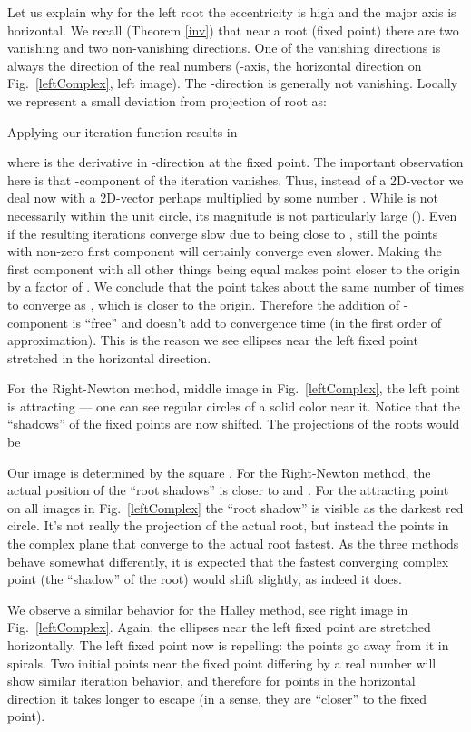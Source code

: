 \documentclass{article}
\theoremstyle{definition}
\begin{document}
Let us explain why for the left root the eccentricity is high and the major axis is horizontal. We recall (Theorem \ref{inv}) that near a root (fixed point) there are two vanishing and two non-vanishing directions. One of the vanishing directions is always the direction of the real numbers (-axis, the horizontal direction on  Fig.~\ref{leftComplex}, left image). The -direction is generally not vanishing. Locally we represent a small deviation from projection  of root  as:

Applying our iteration function results in

where  is the derivative in -direction at the fixed point. The important observation here is that -component of the iteration vanishes. Thus, instead of  a 2D-vector  we deal now with a 2D-vector  perhaps multiplied by some number . While  is not necessarily within the unit circle, its magnitude is not particularly large (). Even if the resulting iterations converge slow due to  being close to , still the points with non-zero first component will certainly converge even slower. Making the first component  with all other things being equal makes point closer to the origin by a factor of . We conclude that the point  takes about the same number of times to converge as , which is closer to the origin. Therefore the addition of -component is ``free'' and doesn't add to convergence time (in the first order of approximation). This is the reason we see ellipses near the left fixed point stretched in the horizontal direction.

For the Right-Newton method, middle image in Fig.~\ref{leftComplex}, the left point is attracting --- one can see regular circles of a solid color near it. Notice that the ``shadows'' of the fixed points are now shifted. The projections of the roots would be

Our image is determined by the square . For the Right-Newton method, the actual position of the ``root shadows'' is closer to  and . For the attracting point on all images in Fig.~\ref{leftComplex} the ``root shadow'' is visible as the darkest red circle. It's not really the projection of the actual root, but instead the points in the complex plane that converge to the actual root fastest. As the three methods behave somewhat differently, it is expected that the fastest converging complex point (the ``shadow'' of the root) would shift slightly, as indeed it does.

We observe a similar behavior for the Halley method, see right image in Fig.~\ref{leftComplex}. Again, the ellipses near the left fixed point are stretched horizontally. The left fixed point now is repelling: the points go away from it in spirals. Two initial points near the fixed point differing by a real number will show similar iteration behavior, and therefore for points in the horizontal direction it takes longer to escape (in a sense, they are ``closer'' to the fixed point).
\end{document}
